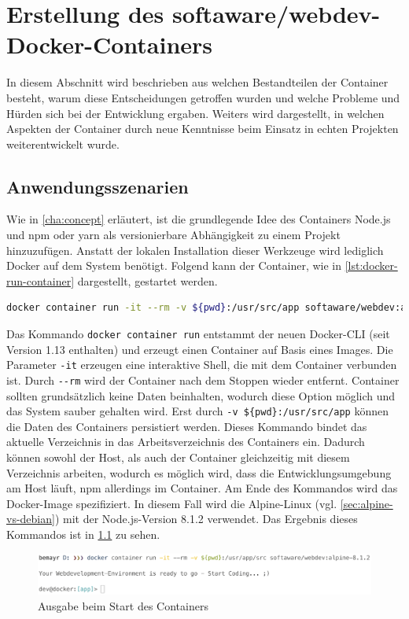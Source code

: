 \chapter{Erstellung des softaware/webdev-Docker-Containers}
\label{cha:implementation}
In diesem Abschnitt wird beschrieben aus welchen Bestandteilen der Container besteht, warum diese Entscheidungen getroffen wurden und welche Probleme und Hürden sich bei der Entwicklung ergaben.
Weiters wird dargestellt, in welchen Aspekten der Container durch neue Kenntnisse beim Einsatz in echten Projekten weiterentwickelt wurde.

\section{Anwendungsszenarien}
Wie in \cref{cha:concept} erläutert, ist die grundlegende Idee des Containers Node.js und npm oder yarn als versionierbare Abhängigkeit zu einem Projekt hinzuzufügen.
Anstatt der lokalen Installation dieser Werkzeuge wird lediglich Docker auf dem System benötigt.
Folgend kann der Container, wie in \cref{lst:docker-run-container} dargestellt, gestartet werden.
\begin{lstlisting}[caption=Kommando zum Starten des softaware/webdev-Containers, language=bash, label=lst:docker-run-container]
docker container run -it --rm -v ${pwd}:/usr/src/app softaware/webdev:alpine-8.1.2
\end{lstlisting}
Das Kommando \verb|docker container run| entstammt der neuen Docker-CLI (seit Version 1.13 enthalten) und erzeugt einen Container auf Basis eines Images.
Die Parameter \verb|-it| erzeugen eine interaktive Shell, die mit dem Container verbunden ist.
Durch \verb|--rm| wird der Container nach dem Stoppen wieder entfernt.
Container sollten grundsätzlich keine Daten beinhalten, wodurch diese Option möglich und das System sauber gehalten wird.
Erst durch \verb|-v ${pwd}:/usr/src/app| können die Daten des Containers persistiert werden.
Dieses Kommando bindet das aktuelle Verzeichnis in das Arbeitsverzeichnis des Containers ein.
Dadurch können sowohl der Host, als auch der Container gleichzeitig mit diesem Verzeichnis arbeiten, wodurch es möglich wird, dass die Entwicklungsumgebung am Host läuft, npm allerdings im Container.
Am Ende des Kommandos wird das Docker-Image spezifiziert.
In diesem Fall wird die Alpine-Linux (vgl. \cref{sec:alpine-vs-debian}) mit der Node.js-Version 8.1.2 verwendet.
Das Ergebnis dieses Kommandos ist in \cref{fig:container-execution} zu sehen.
\begin{figure}[htbp]
    \centering
    \includegraphics[width=0.95\linewidth,clip]{images/container-execution}
    \caption{Ausgabe beim Start des Containers}
\label{fig:container-execution}
\end{figure}

